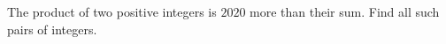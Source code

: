 The product of two positive integers is $2020$ more than their sum. Find all such pairs of integers.

